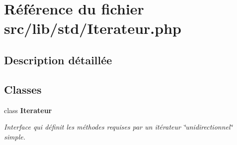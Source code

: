 \section{Référence du fichier src/lib/std/Iterateur.php}
\label{_iterateur_8php}


\subsection{Description détaillée}


\subsection*{Classes}
\begin{CompactItemize}
\item 
class {\bf Iterateur}
\begin{CompactList}\small\item\em Interface qui définit les méthodes requises par un itérateur \char`\"{}unidirectionnel\char`\"{} simple. \item\end{CompactList}\end{CompactItemize}
